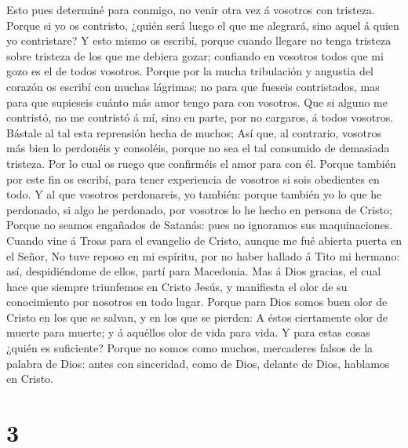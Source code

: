  Esto pues determiné para conmigo, no venir otra vez á
vosotros con tristeza.  Porque si yo os contristo, ¿quién
será luego el que me alegrará, sino aquel á quien yo contristare?
 Y esto mismo os escribí, porque cuando llegare no tenga
tristeza sobre tristeza de los que me debiera gozar; confiando en
vosotros todos que mi gozo es el de todos vosotros.  Porque
por la mucha tribulación y angustia del corazón os escribí con muchas
lágrimas; no para que fueseis contristados, mas para que supieseis
cuánto más amor tengo para con vosotros.  Que si alguno me
contristó, no me contristó á mí, sino en parte, por no cargaros, á todos
vosotros.  Bástale al tal esta reprensión hecha de muchos;
 Así que, al contrario, vosotros más bien lo perdonéis y
consoléis, porque no sea el tal consumido de demasiada tristeza.
 Por lo cual os ruego que confirméis el amor para con él.
 Porque también por este fin os escribí, para tener
experiencia de vosotros si sois obedientes en todo.  Y al
que vosotros perdonareis, yo también: porque también yo lo que he
perdonado, si algo he perdonado, por vosotros lo he hecho en persona de
Cristo;  Porque no seamos engañados de Satanás: pues no
ignoramos sus maquinaciones.  Cuando vine á Troas para el
evangelio de Cristo, aunque me fué abierta puerta en el Señor,
 No tuve reposo en mi espíritu, por no haber hallado á Tito
mi hermano: así, despidiéndome de ellos, partí para Macedonia.
 Mas á Dios gracias, el cual hace que siempre triunfemos en
Cristo Jesús, y manifiesta el olor de su conocimiento por nosotros en
todo lugar.  Porque para Dios somos buen olor de Cristo en
los que se salvan, y en los que se pierden:  A éstos
ciertamente olor de muerte para muerte; y á aquéllos olor de vida para
vida. Y para estas cosas ¿quién es suficiente?  Porque no
somos como muchos, mercaderes falsos de la palabra de Dios: antes con
sinceridad, como de Dios, delante de Dios, hablamos en Cristo.

\hypertarget{section-2}{%
\section{3}\label{section-2}}

